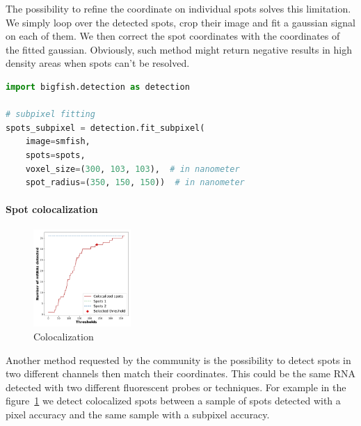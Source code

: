 The possibility to refine the coordinate on individual spots solves this limitation.
We simply loop over the detected spots, crop their image and fit a gaussian signal on each of them.
We then correct the spot coordinates with the coordinates of the fitted gaussian.
Obviously, such method might return negative results in high density areas when spots can't be resolved.\\

\begin{minipage}{0.9\textwidth}
\begin{lstlisting}[language=Python]
import bigfish.detection as detection

# subpixel fitting
spots_subpixel = detection.fit_subpixel(
    image=smfish,
    spots=spots,
    voxel_size=(300, 103, 103),  # in nanometer
    spot_radius=(350, 150, 150))  # in nanometer
\end{lstlisting}
\end{minipage}

\paragraph{Spot colocalization}

\begin{figure}
  \begin{center}
    \includegraphics[width=0.33\textwidth]{figures/chapter2/colocalization_elbow}
  \end{center}
  \caption{Colocalization}
  \label{fig:elbow_colocalization}
\end{figure}

Another method requested by the community is the possibility to detect spots in two different channels then match their coordinates.
This could be the same \ac{RNA} detected with two different fluorescent probes or techniques.
For example in the figure~\ref{fig:elbow_colocalization} we detect colocalized spots between a sample of spots detected with a pixel accuracy and the same sample with a subpixel accuracy.

